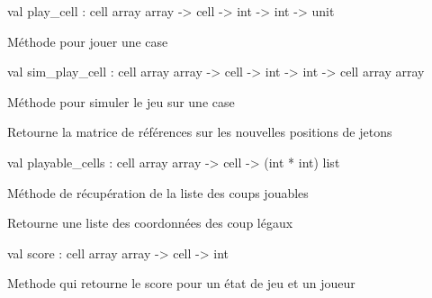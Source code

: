 \documentclass[11pt]{article}
\begin{document}
\label{val:Othello.play-underscorecell}\begin{ocamldoccode}
val play_cell : cell array array -> cell -> int -> int -> unit
\end{ocamldoccode}
\begin{ocamldocdescription}
Méthode pour jouer une case


\end{ocamldocdescription}




\label{val:Othello.sim-underscoreplay-underscorecell}\begin{ocamldoccode}
val sim_play_cell :
  cell array array ->
  cell -> int -> int -> cell array array
\end{ocamldoccode}
\begin{ocamldocdescription}
Méthode pour simuler le jeu sur une case


\end{ocamldocdescription}




Retourne la matrice de références sur les nouvelles positions de jetons



\label{val:Othello.playable-underscorecells}\begin{ocamldoccode}
val playable_cells : cell array array -> cell -> (int * int) list
\end{ocamldoccode}
\begin{ocamldocdescription}
Méthode de récupération de la liste des coups jouables


\end{ocamldocdescription}




Retourne une liste des coordonnées des coup légaux



\label{val:Othello.score}\begin{ocamldoccode}
val score : cell array array -> cell -> int
\end{ocamldoccode}
\begin{ocamldocdescription}
Methode qui retourne le score pour un état de jeu et un joueur


\end{ocamldocdescription}
\end{document}
